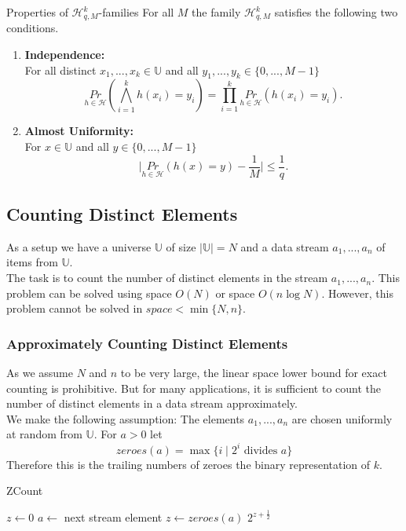 \documentclass[english]{panikzettel}
\begin{document}
\begin{theo}{Properties of $\mathcal{H}_{q,M}^k$-families}
For all $M$ the family $\mathcal{H}_{q,M}^k$ satisfies the following two conditions.
\begin{enumerate}
\item \textbf{Independence:}\\
For all distinct $x_1,...,x_k\in\mathbb{U}$ and all $y_1,...,y_k\in\{0,...,M-1 \}$
\[
\underset{h\in\mathcal{H}}{Pr}\left( \bigwedge_{i=1}^k h(x_i)=y_i \right) = \prod_{i=1}^k \underset{h\in\mathcal{H}}{Pr}(h(x_i)=y_i).
\]
\item \textbf{Almost Uniformity:}\\ For $x\in\mathbb{U}$ and all $y\in\{0,...,M-1 \}$
\[
\bigg|\underset{h\in\mathcal{H}}{Pr} (h(x)=y)-\frac{1}{M}\bigg|\leq \frac{1}{q}.
\]
\end{enumerate}
\end{theo}



\subsection{Counting Distinct Elements}
As a setup we have a universe $\mathbb{U}$ of size $|\mathbb{U}|=N$ and a data stream $a_1,...,a_n$ of items from $\mathbb{U}$.\\
The task is to count the number of distinct elements in the stream $a_1,...,a_n$. This problem can be solved using space $O(N)$ or space $O(n\log N)$. However, this problem cannot be solved in $space < \min\{N,n \}.$

\subsubsection{Approximately Counting Distinct Elements}
As we assume $N$ and $n$ to be very large, the linear space lower bound for exact counting is prohibitive. But for many applications, it is sufficient to count the number of distinct elements in a data stream approximately.\\
We make the following assumption:
The elements $a_1,...,a_n$ are chosen uniformly at random from $\mathbb{U}$. For $a>0$ let
\[
zeroes(a)=\max \{i \mid 2^i \text{ divides } a \}
\]
Therefore this is the trailing numbers of zeroes the binary representation of $k$.

\begin{algo}{ZCount}
{
\renewcommand{\algorithmicrequire}{\textbf{Input:}}
\renewcommand{\algorithmicensure}{\textbf{Output:}}
  \begin{algorithmic}[1]
  \State $z\leftarrow 0$
  	\State $a\leftarrow$ next stream element
    \State $z\leftarrow zeroes(a)$
    \EndIf
  \EndWhile
  \State \Return $2^{z+\frac{1}{2}}$ 
  \end{algorithmic}
}
\end{algo}
\end{document}

